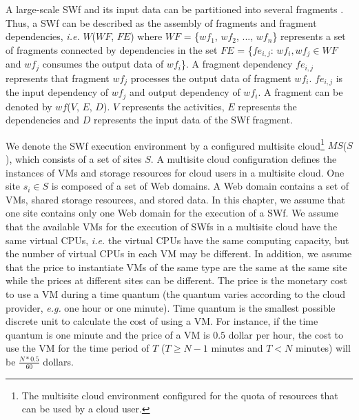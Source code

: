 A large-scale SWf and its input data can be partitioned into several fragments \cite{Chen2013} \cite{Liu2014}. Thus, a SWf can be described as the assembly of fragments and fragment dependencies, \textit{i.e.} $W$($WF$, $FE$) where $WF$ = \{$wf_1$, $wf_2$, ..., $wf_n$\} represents a set of fragments connected by dependencies in the set $FE$ = \{$fe_{i,j}$: $wf_i, wf_j \in WF$ and $wf_j$ consumes the output data of $wf_i$\}. A fragment dependency $fe_{i,j}$ represents that fragment $wf_{j}$ processes the output data of fragment $wf_{i}$. $fe_{i,j}$ is the input dependency of $wf_{j}$ and output dependency of $wf_{i}$. A fragment can be denoted by $wf$($V$, $E$, $D$). $V$ represents the activities, $E$ represents the dependencies and $D$ represents the input data of the SWf fragment. 

We denote the SWf execution environment by a configured multisite cloud\footnote{The multisite cloud environment configured for the quota of resources that can be used by a cloud user.} $MS$($S$), which consists of a set of sites $S$. A multisite cloud configuration defines the instances of VMs and storage resources for cloud users in a multisite cloud. One site $s_{i} \in S$ is composed of a set of Web domains. A Web domain contains a set of VMs, shared storage resources, and stored data. In this chapter, we assume that one site contains only one Web domain for the execution of a SWf. We assume that the available VMs for the execution of SWfs in a multisite cloud have the same virtual CPUs, \textit{i.e.} the virtual CPUs have the same computing capacity, but the number of virtual CPUs in each VM may be different.
In addition, we assume that the price to instantiate VMs of the same type are the same at the same site while the prices at different sites can be different. The price is the monetary cost to use a VM during a time quantum (the quantum varies according to the cloud provider, \textit{e.g.} one hour or one minute). Time quantum is the smallest possible discrete unit to calculate the cost of using a VM. For instance, if the time quantum is one minute and the price of a VM is $0.5$ dollar per hour, the cost to use the VM for the time period of $T$ ($T \geq N - 1$ minutes and $T < N$ minutes) will be $\frac{N * 0.5}{60}$ dollars.

